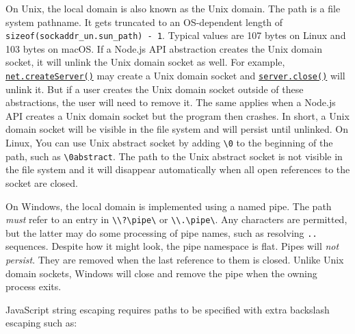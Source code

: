 On Unix, the local domain is also known as the Unix domain. The path is
a file system pathname. It gets truncated to an OS-dependent length of
\texttt{sizeof(sockaddr\_un.sun\_path)\ -\ 1}. Typical values are 107
bytes on Linux and 103 bytes on macOS. If a Node.js API abstraction
creates the Unix domain socket, it will unlink the Unix domain socket as
well. For example,
\hyperref[netcreateserveroptions-connectionlistener]{\texttt{net.createServer()}}
may create a Unix domain socket and
\hyperref[serverclosecallback]{\texttt{server.close()}} will unlink it.
But if a user creates the Unix domain socket outside of these
abstractions, the user will need to remove it. The same applies when a
Node.js API creates a Unix domain socket but the program then crashes.
In short, a Unix domain socket will be visible in the file system and
will persist until unlinked. On Linux, You can use Unix abstract socket
by adding \texttt{\textbackslash{}0} to the beginning of the path, such
as \texttt{\textbackslash{}0abstract}. The path to the Unix abstract
socket is not visible in the file system and it will disappear
automatically when all open references to the socket are closed.

On Windows, the local domain is implemented using a named pipe. The path
\emph{must} refer to an entry in
\texttt{\textbackslash{}\textbackslash{}?\textbackslash{}pipe\textbackslash{}}
or
\texttt{\textbackslash{}\textbackslash{}.\textbackslash{}pipe\textbackslash{}}.
Any characters are permitted, but the latter may do some processing of
pipe names, such as resolving \texttt{..} sequences. Despite how it
might look, the pipe namespace is flat. Pipes will \emph{not persist}.
They are removed when the last reference to them is closed. Unlike Unix
domain sockets, Windows will close and remove the pipe when the owning
process exits.

JavaScript string escaping requires paths to be specified with extra
backslash escaping such as:

\begin{Shaded}
\begin{Highlighting}[]
\NormalTok{()}\NormalTok{(}
\NormalTok{(}\StringTok{\textquotesingle{}}\SpecialCharTok{\textbackslash{}\textbackslash{}\textbackslash{}\textbackslash{}}\SpecialCharTok{\textbackslash{}\textbackslash{}}\OperatorTok{,} \NormalTok{()}\OperatorTok{,} \NormalTok{))}\OperatorTok{;}
\end{Highlighting}
\end{Shaded}


